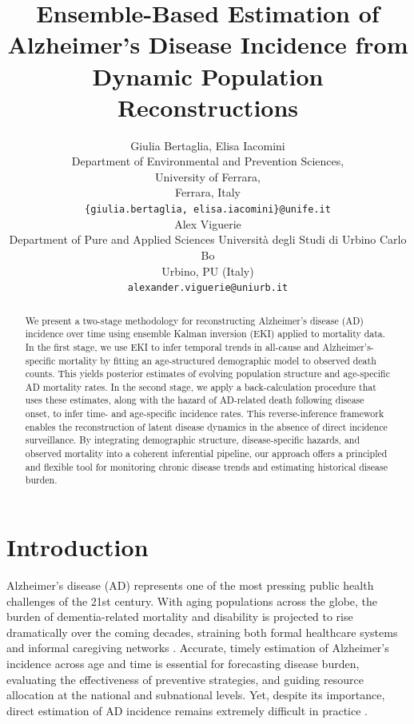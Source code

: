 \documentclass{article}
\title{Ensemble-Based Estimation of Alzheimer’s Disease Incidence from Dynamic Population Reconstructions 
}
\author{
  Giulia Bertaglia, Elisa Iacomini \\
  Department of Environmental and Prevention Sciences, \\
  University of Ferrara, \\
  Ferrara, Italy\\
  \texttt{\{giulia.bertaglia, elisa.iacomini\}@unife.it} \\
   \And
  Alex Viguerie \\
  Department of Pure and Applied Sciences
  Universit\`a degli Studi di Urbino Carlo Bo \\
   Urbino, PU (Italy)\\
  \texttt{alexander.viguerie@uniurb.it} \\
}
\begin{document}
\maketitle


\begin{abstract}
We present a two-stage methodology for reconstructing Alzheimer's disease (AD) incidence over time using ensemble Kalman inversion (EKI) applied to mortality data. In the first stage, we use EKI to infer temporal trends in all-cause and Alzheimer’s-specific mortality by fitting an age-structured demographic model to observed death counts. This yields posterior estimates of evolving population structure and age-specific AD mortality rates. In the second stage, we apply a back-calculation procedure that uses these estimates, along with the hazard of AD-related death following disease onset, to infer time- and age-specific incidence rates. This reverse-inference framework enables the reconstruction of latent disease dynamics in the absence of direct incidence surveillance. By integrating demographic structure, disease-specific hazards, and observed mortality into a coherent inferential pipeline, our approach offers a principled and flexible tool for monitoring chronic disease trends and estimating historical disease burden.

\end{abstract}



\section{Introduction}
Alzheimer’s disease (AD) represents one of the most pressing public health challenges of the 21st century. With aging populations across the globe, the burden of dementia-related mortality and disability is projected to rise dramatically over the coming decades, straining both formal healthcare systems and informal caregiving networks \cite{cimler2019predictions, wolters2020twenty, zissimopoulos2018impact}. Accurate, timely estimation of Alzheimer’s incidence across age and time is essential for forecasting disease burden, evaluating the effectiveness of preventive strategies, and guiding resource allocation at the national and subnational levels. Yet, despite its importance, direct estimation of AD incidence remains extremely difficult in practice \cite{brookmeyer2011national, tahami2022alzheimer, gustavsson2023global, alzheimer2025}.
\end{document}
